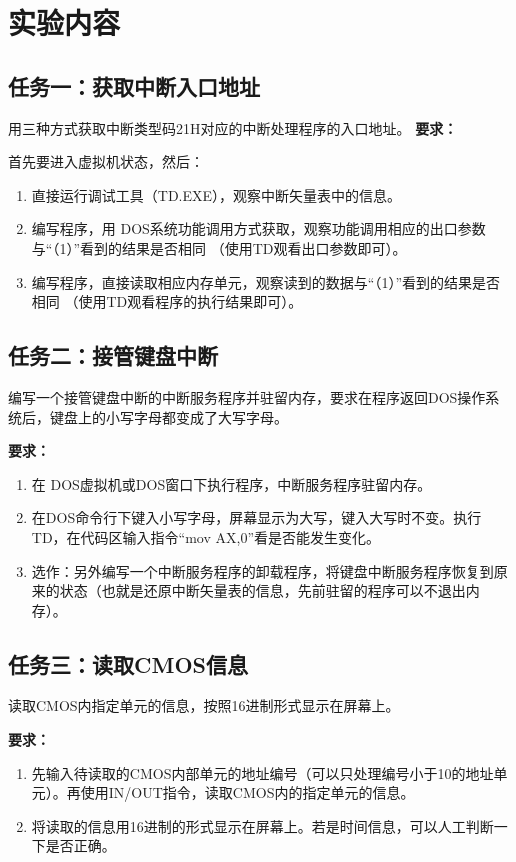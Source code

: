 \documentclass{article}
\begin{document}
	\section{实验内容}
	\subsection[任务一]{任务一：获取中断入口地址}
	用三种方式获取中断类型码21H对应的中断处理程序的入口地址。
	\noindent\textbf{要求：} \par
	首先要进入虚拟机状态，然后：\par
	\begin{enumerate}
		\item 直接运行调试工具（TD.EXE），观察中断矢量表中的信息。
		\item 编写程序，用 DOS系统功能调用方式获取，观察功能调用相应的出口参数与“（1）”看到的结果是否相同 （使用TD观看出口参数即可）。
		\item 编写程序，直接读取相应内存单元，观察读到的数据与“（1）”看到的结果是否相同 （使用TD观看程序的执行结果即可）。
	\end{enumerate}

	\subsection[任务二]{任务二：接管键盘中断}
	编写一个接管键盘中断的中断服务程序并驻留内存，要求在程序返回DOS操作系统后，键盘上的小写字母都变成了大写字母。 \par
	\noindent\textbf{要求：} \par
	\begin{enumerate}
		\item 在 DOS虚拟机或DOS窗口下执行程序，中断服务程序驻留内存。
		\item 在DOS命令行下键入小写字母，屏幕显示为大写，键入大写时不变。执行TD，在代码区输入指令“mov  AX,0”看是否能发生变化。
		\item 选作：另外编写一个中断服务程序的卸载程序，将键盘中断服务程序恢复到原来的状态（也就是还原中断矢量表的信息，先前驻留的程序可以不退出内存）。
	\end{enumerate}

	\subsection[任务三]{任务三：读取CMOS信息}
	读取CMOS内指定单元的信息，按照16进制形式显示在屏幕上。\par
	\noindent\textbf{要求：} \par
	\begin{enumerate}
		\item 先输入待读取的CMOS内部单元的地址编号（可以只处理编号小于10的地址单元）。再使用IN/OUT指令，读取CMOS内的指定单元的信息。
		\item 将读取的信息用16进制的形式显示在屏幕上。若是时间信息，可以人工判断一下是否正确。
	\end{enumerate}
\end{document}
